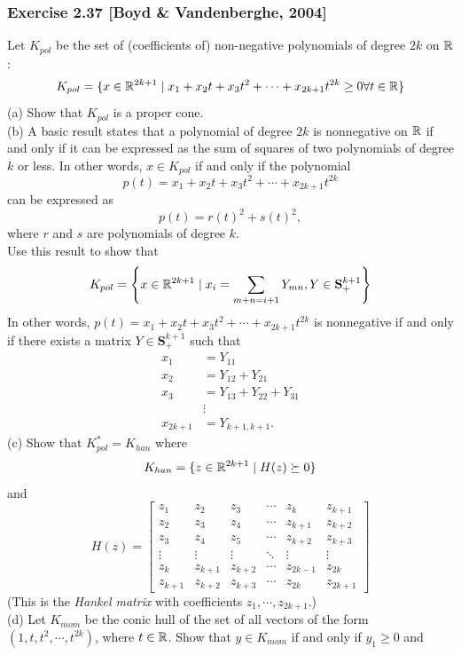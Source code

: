 \documentclass[12pt,a4paper]{article}
\renewcommand{\l}{\left}\renewcommand{\r}{\right}
\newcommand{\SUM}[2]{\sum\limits_{#1}^{#2}}
\def\R{\ifmmode\mathbb R\fi}
\def\vS{\mathbf{S}}
\begin{document}
\subsubsection*{Exercise 2.37 [Boyd \& Vandenberghe, 2004]}
 Let $K_{pol}$ be the set of (coefficients of) non-negative polynomials of degree $2k$ on $\R$:
$$K_{pol} = \{ x\in \R^{2k+1} \mid x_1 + x_2t + x_3t^2 + \cdots + x_{2k+1}t^{2k} \geq 0 \forall t\in\R\}$$
(a) Show that $K_{pol}$ is a proper cone. \\
(b) A basic result states that a polynomial of degree $2k$ is nonnegative on $\R$ if and only if it can be expressed as the sum of squares of two polynomials of degree $k$ or less. In other words, $x\in K_{pol}$ if and only if the polynomial 
$$p(t) = x_1 + x_2t + x_3t^2 + \cdots + x_{2k+1}t^{2k}$$
can be expressed as 
$$p(t) = r(t)^2 + s(t)^2,$$
where $r$ and $s$ are polynomials of degree $k$. \\
Use this result to show that 
$$K_{pol} = \l\{x\in\R^{2k+1} \mid x_i = \SUM{m+n=i+1}{} Y_{mn}, Y \in \vS^{k+1}_+  \r\}$$
In other words, $p(t) = x_1 + x_2 t + x_3 t^2 + \cdots + x_{2k+1}t^{2k}$ is nonnegative if and only if there exists a matrix $Y\in\vS^{k+1}_+$ such that 
\begin{align*}
x_1 &= Y_{11}\\
x_2 &= Y_{12} + Y_{21} \\
x_3 &= Y_{13}+Y_{22}+Y_{31}\\
&\vdots\\
x_{2k+1} &= Y_{k+1,k+1}.
\end{align*}
(c) Show that $K_{pol}^\ast = K_{han}$ where 
$$K_{han} = \{z\in\R^{2k+1} \mid H(z) \succeq 0\}$$
and 
$$H(z) = \l[\begin{array}{cccccc}
z_1 & z_2 & z_3 & \cdots & z_k & z_{k+1}\\
z_2 & z_3 & z_4 & \cdots & z_{k+1} & z_{k+2}\\
z_3 & z_4 & z_5 & \cdots & z_{k+2} & z_{k+3}\\
\vdots & \vdots & \vdots & \ddots & \vdots & \vdots\\
z_k & z_{k+1} & z_{k+2} & \cdots & z_{2k-1} & z_{2k}\\
z_{k+1} & z_{k+2} & z_{k+3} & \cdots & z_{2k} & z_{2k+1}
 \end{array}\r]$$
(This is the {\it Hankel matrix} with coefficients $z_1, \cdots, z_{2k+1}$.) \\
(d) Let $K_{mom}$ be the conic hull of the set of all vectors of the form $(1,t,t^2, \cdots, t^{2k})$, where $t\in\R$. Show that $y\in K_{mom}$ if and only if $y_1\geq 0$ and 
\end{document}

